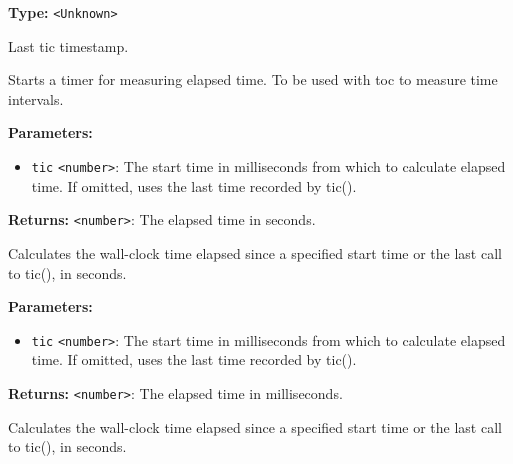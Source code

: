 \documentclass[12pt,a4paper]{article}
\begin{document}
\noindent \textbf{Type:} \texttt{<Unknown>}

\noindent Last tic timestamp.

\vspace{5mm}
\noindent {}


\noindent Starts a timer for measuring elapsed time. To be used with \textasciigrave{}toc\textasciigrave{} to measure time intervals.

\vspace{5mm}
\noindent {}


\noindent \textbf{Parameters:}
\begin{itemize}
  \item \texttt{tic} \texttt{<number>}: The start time in milliseconds from which to calculate elapsed time. If omitted, uses the last time recorded by \textasciigrave{}tic()\textasciigrave{}.
\end{itemize}

\noindent \textbf{Returns:} \texttt{<number>}: The elapsed time in seconds.

\noindent Calculates the wall-clock time elapsed since a specified start time or the last call to \textasciigrave{}tic()\textasciigrave{}, in seconds.

\vspace{5mm}
\noindent {}


\noindent \textbf{Parameters:}
\begin{itemize}
  \item \texttt{tic} \texttt{<number>}: The start time in milliseconds from which to calculate elapsed time. If omitted, uses the last time recorded by \textasciigrave{}tic()\textasciigrave{}.
\end{itemize}

\noindent \textbf{Returns:} \texttt{<number>}: The elapsed time in milliseconds.

\noindent Calculates the wall-clock time elapsed since a specified start time or the last call to \textasciigrave{}tic()\textasciigrave{}, in seconds.

\vspace{5mm}
\noindent {}
\end{document}
